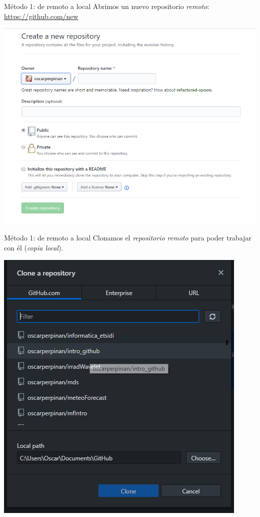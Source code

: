 \documentclass[aspectratio=169, xcolor={usenames,svgnames,dvipsnames}]{beamer}
\begin{document}
\begin{frame}[label={sec:orged90f05}]{Método 1: de remoto a local}
Abrimos un nuevo repositorio \emph{remoto}: \url{https://github.com/new}

\begin{center}
\includegraphics[width=.9\linewidth]{figs/GitHub_New_Repository.png}
\end{center}
\end{frame}

\begin{frame}[label={sec:org4ba9272}]{Método 1: de remoto a local}
Clonamos el \emph{repositorio remoto} para poder trabajar con él (\emph{copia local}).

\begin{center}
\end{center}

\begin{center}
\includegraphics[height=0.65\textheight]{figs/Desktop_CloneRepository.png}
\end{center}
\end{frame}
\end{document}
